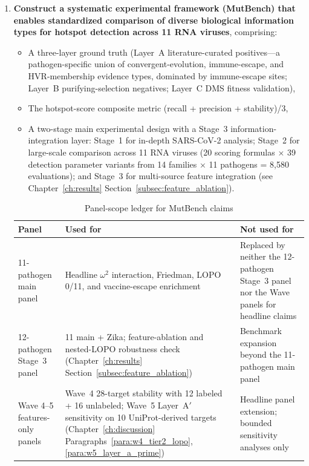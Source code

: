\begin{enumerate}[label=\textbf{Objective \arabic*.}]
  \item \textbf{Construct a systematic experimental framework (MutBench) that enables standardized comparison of diverse biological information types for hotspot detection across 11 RNA viruses}, comprising:
  \begin{itemize}
  \item A three-layer ground truth (Layer~A literature-curated positives---a pathogen-specific union of convergent-evolution, immune-escape, and HVR-membership evidence types, dominated by immune-escape sites; Layer~B purifying-selection negatives; Layer~C DMS fitness validation),
  \item The hotspot-score composite metric (recall + precision + stability)/3,
  \item A two-stage main experimental design with a Stage~3 information-integration layer: Stage~1 for in-depth SARS-CoV-2 analysis; Stage~2 for large-scale comparison across 11 RNA viruses (20 scoring formulas $\times$ 39 detection parameter variants from 14 families $\times$ 11 pathogens = 8{,}580 evaluations); and Stage~3 for multi-source feature integration (see Chapter~\ref{ch:results} Section~\ref{subsec:feature_ablation}).
  \end{itemize}

\begin{table}[htbp]
\centering
\caption{Panel-scope ledger for MutBench claims}
\label{tab:intro_panel_scope}
\small
\begin{tabularx}{\textwidth}{p{}XX}
\toprule
\textbf{Panel} & \textbf{Used for} & \textbf{Not used for} \\
\midrule
11-pathogen main panel & Headline $\omega^2$ interaction, Friedman, LOPO 0/11, and vaccine-escape enrichment & Replaced by neither the 12-pathogen Stage~3 panel nor the Wave panels for headline claims \\
12-pathogen Stage~3 panel & 11 main + Zika; feature-ablation and nested-LOPO robustness check (Chapter~\ref{ch:results} Section~\ref{subsec:feature_ablation}) & Benchmark expansion beyond the 11-pathogen main panel \\
Wave 4--5 features-only panels & Wave~4 28-target stability with 12 labeled + 16 unlabeled; Wave~5 Layer~A$'$ sensitivity on 10 UniProt-derived targets (Chapter~\ref{ch:discussion} Paragraphs~\ref{para:w4_tier2_lopo}, \ref{para:w5_layer_a_prime}) & Headline panel extension; bounded sensitivity analyses only \\
\bottomrule
\end{tabularx}
\end{table}


\end{enumerate}

